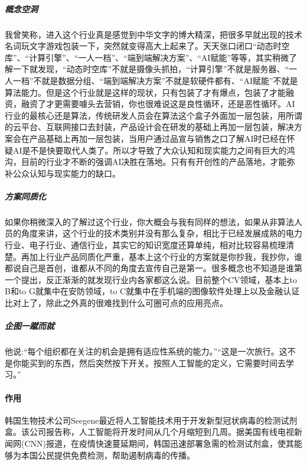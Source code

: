 \documentclass[letterpaper,10pt,english]{sphinxmanual}
\begin{document}
\subparagraph{概念空洞}
\label{\detokenize{chapter_introduction/AI:id19}}
我曾笑称，进入这个行业真是感觉到中华文字的博大精深，把很多早就出现的技术名词玩文字游戏包装一下，突然就变得高大上起来了。天天张口闭口“动态时空库”、“计算引擎”、“一人一档”、“端到端解决方案”、“AI赋能”等等，其实稍微了解一下就发现，“动态时空库”不就是摄像头抓拍，“计算引擎”不就是服务器、“一人一档”不就是数据分组、“端到端解决方案”不就是软硬件都有、“AI赋能”不就是算法能力。但是这个行业就是这样的现状，只有包装了才有爆点，包装了才能融资，融资了才更需要噱头去营销，你也很难说这是良性循环，还是恶性循环。AI行业的最核心还是算法，传统研发人员会在算法这个盒子外面加一层包装，用所谓的云平台、互联网接口去封装，产品设计会在研发的基础上再加一层包装，解决方案会在产品基础上再加一层包装，当用户通过品宣与销售之口了解AI时已经在怀疑AI是不是快要取代人类了。所以才导致了大众认知和现实能力之间有巨大的鸿沟，目前的行业才不断的强调AI决胜在落地。只有有开创性的产品落地，才能弥补公众认知与现实能力的缺口。


\subparagraph{方案同质化}
\label{\detokenize{chapter_introduction/AI:id20}}
如果你稍微深入的了解过这个行业，你大概会与我有同样的想法，如果从非算法人员的角度来讲，这个行业的技术类别并没有那么复杂，相比于已经发展成熟的电力行业、电子行业、通信行业，其实它的知识宽度还算单纯，相对比较容易梳理清楚。再加上行业产品同质化严重，基本上这个行业的方案就是你抄我，我抄你，谁都说自己是首创，谁都从不同的角度去宣传自己是第一。很多概念也不知道是谁第一个提出，反正渐渐的就发现行业内各家都这么说。目前整个CV领域，基本上to
B和to G就集中在安防领域，to
C就集中在手机端的图像软件处理上以及金融认证比对上了，除此之外真的很难找到什么可圈可点的应用亮点。


\subparagraph{企图一蹴而就}
\label{\detokenize{chapter_introduction/AI:id21}}
他说:“每个组织都在关注的机会是拥有适应性系统的能力。”“这是一次旅行。这不是你能买到的东西，然后突然按下开关。按照人工智能的定义，它需要时间去学习。”


\paragraph{作用}
\label{\detokenize{chapter_introduction/AI:id22}}
韩国生物技术公司Seegene最近将人工智能技术用于开发新型冠状病毒的检测试剂盒。该公司报告称，人工智能将开发时间从几个月缩短到几周。据美国有线电视新闻网(CNN)报道，在疫情快速蔓延期间，韩国迅速部署急需的检测试剂盒，使其能够为本国公民提供免费检测，帮助遏制病毒的传播。%
\begin{footnote}[228]\sphinxAtStartFootnote
{}
%
\end{footnote}
\end{document}
